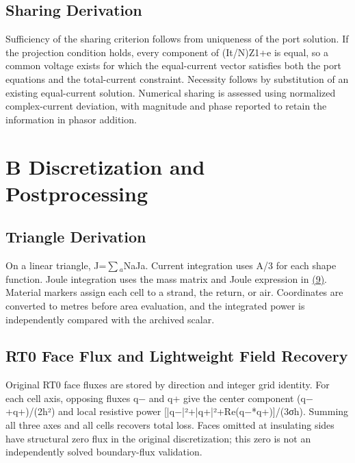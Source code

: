 \documentclass[11pt]{article}
\begin{document}
\subsection*{Sharing Derivation}
\hypertarget{A.sharing_derivation.heading}{}
Sufficiency of the sharing criterion follows from uniqueness of the port solution. If the projection condition holds, every component of (It/N)Z1+e is equal, so a common voltage exists for which the equal-current vector satisfies both the port equations and the total-current constraint. Necessity follows by substitution of an existing equal-current solution. Numerical sharing is assessed using normalized complex-current deviation, with magnitude and phase reported to retain the information in phasor addition.


\FloatBarrier
\section*{B Discretization and Postprocessing}
\hypertarget{chapter-B}{}
\subsection*{Triangle Derivation}
\hypertarget{B.triangle_derivation.heading}{}
On a linear triangle, J=\(\sum\)\(_a\)NaJa. Current integration uses A/3 for each shape function. Joule integration uses the mass matrix and Joule expression in \href{report_en_single.pdf#E09}{(9)}. Material markers assign each cell to a strand, the return, or air. Coordinates are converted to metres before area evaluation, and the integrated power is independently compared with the archived scalar.


\subsection*{RT0 Face Flux and Lightweight Field Recovery}
\hypertarget{B.report_rt0.heading}{}
Original RT0 face fluxes are stored by direction and integer grid identity. For each cell axis, opposing fluxes q− and q+ give the center component (q−+q+)/(2h²) and local resistive power [|q−|²+|q+|²+Re(q−*q+)]/(3σh). Summing all three axes and all cells recovers total loss. Faces omitted at insulating sides have structural zero flux in the original discretization; this zero is not an independently solved boundary-flux validation.
\end{document}
